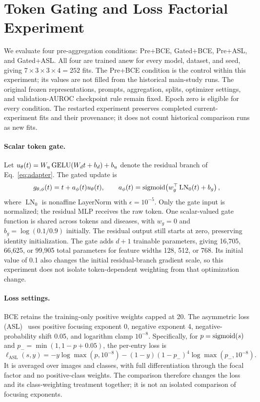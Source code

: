 



\clearpage
\section{Token Gating and Loss Factorial Experiment}
\label{app:gated_asl}
We evaluate four pre-aggregation conditions: Pre+BCE, Gated+BCE, Pre+ASL, and Gated+ASL. All four are trained anew for every model, dataset, and seed, giving $7\times3\times3\times4=252$ fits. The Pre+BCE condition is the control within this experiment; its values are not filled from the historical main-study runs. The original frozen representations, prompts, aggregation, splits, optimizer settings, and validation-AUROC checkpoint rule remain fixed. Epoch zero is eligible for every condition. The restarted experiment preserves completed current-experiment fits and their provenance; it does not count historical comparison runs as new fits.

\paragraph{Scalar token gate.}
Let $u_\theta(t)=W_u\operatorname{GELU}(W_dt+b_d)+b_u$ denote the residual branch of Eq.~\eqref{eq:adapter}. The gated update is
\begin{equation}
g_{\theta,\phi}(t)=t+a_\phi(t)u_\theta(t),\qquad
a_\phi(t)=\operatorname{sigmoid}\!\left(w_g^\top\operatorname{LN}_0(t)+b_g\right),
\label{eq:token_gate}
\end{equation}
where $\operatorname{LN}_0$ is nonaffine LayerNorm with $\epsilon=10^{-5}$. Only the gate input is normalized; the residual MLP receives the raw token. One scalar-valued gate function is shared across tokens and diseases, with $w_g=0$ and $b_g=\log(0.1/0.9)$ initially. The residual output still starts at zero, preserving identity initialization. The gate adds $d+1$ trainable parameters, giving 16,705, 66,625, or 99,905 total parameters for feature widths 128, 512, or 768. Its initial value of 0.1 also changes the initial residual-branch gradient scale, so this experiment does not isolate token-dependent weighting from that optimization change.

\paragraph{Loss settings.}
BCE retains the training-only positive weights capped at 20. The asymmetric loss (ASL)~\cite{ridnik2021asl} uses positive focusing exponent 0, negative exponent 4, negative-probability shift 0.05, and logarithm clamp $10^{-8}$. Specifically, for $p=\operatorname{sigmoid}(s)$ and $p_-=\min(1,1-p+0.05)$, the per-entry loss is
\begin{equation}
\ell_{\mathrm{ASL}}(s,y)=-y\log\max(p,10^{-8})
-(1-y)(1-p_-)^4\log\max(p_-,10^{-8}).
\label{eq:token_asl}
\end{equation}
It is averaged over images and classes, with full differentiation through the focal factor and no positive-class weights. The comparison therefore changes the loss and its class-weighting treatment together; it is not an isolated comparison of focusing exponents.

